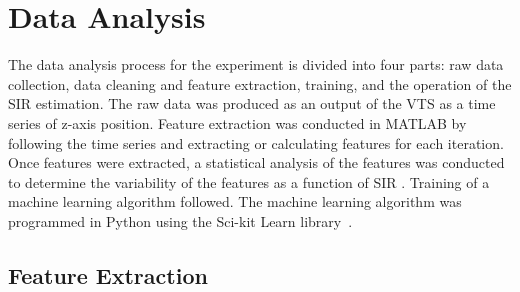 	\section{Data Analysis}\label{sec:dataanalysis}
	
	
	The data analysis process for the experiment
	is divided into four parts: raw data collection, data cleaning and feature extraction, training, and the operation of the SIR estimation. The raw data was produced as an output of the VTS as a time series of z-axis position. Feature extraction was conducted in MATLAB by following the time series and extracting or calculating features for each iteration.  Once features were extracted, a statistical analysis of the features was conducted to determine the variability of the features as a function of SIR \cite{Candell_ISIT_2019}. Training of a machine learning algorithm followed. The machine learning algorithm was programmed in Python using the Sci-kit Learn library~\cite{SCIKITLEARN}.
	
	\subsection{Feature Extraction}\label{sec:data:feats}
	


